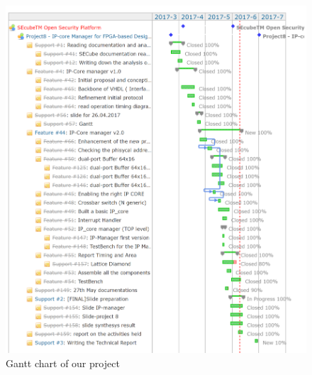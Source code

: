 \begin{figure}[h!]
	\centering	
	\includegraphics[height=0.65 \textheight]{chapters/figures/gantt.png}  
	\caption{Gantt chart of our project} 
	\label{gantt}
\end{figure}	